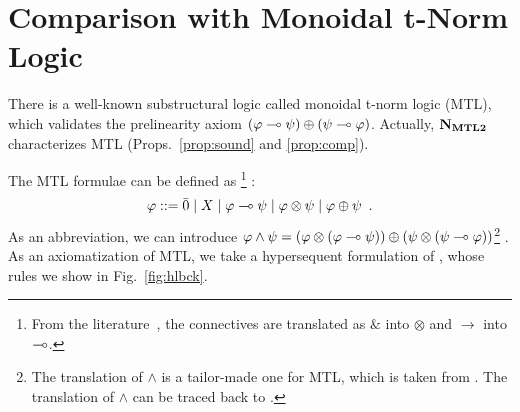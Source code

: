 \documentclass[envcountsame]{llncs}
\begin{document}
\section{Comparison with Monoidal t-Norm Logic}
\label{sec:as-logic}

There is a well-known substructural logic called monoidal t-norm logic
(MTL), which validates the prelinearity axiom
$(\varphi\multimap\psi)\oplus(\psi\multimap\varphi)$.  Actually, $\mathbf{N}_{\mathbf{MTL2}}$ characterizes
MTL (Props.~\ref{prop:sound} and \ref{prop:comp}).

The MTL formulae can be defined as%
\footnote{From the literature~\citep{handbook:fuzzy}, the connectives
are translated as $\&$ into $\otimes$ and $\rightarrow$ into $\multimap$.}%
:
\[
 \varphi::= \bar{0}\mid X\mid \varphi\multimap\psi \mid \varphi\otimes \psi \mid \varphi \oplus \psi\enspace.
\]
As an abbreviation, we can introduce $\varphi\land\psi =  (\varphi\otimes(\varphi\multimap\psi))\oplus
 (\psi\otimes(\psi\multimap\varphi))$\footnote{
The translation of $\wedge$ is a tailor-made one for MTL,
 which is taken from \citep[p.~48]{handbook:fuzzy}.  The translation of $\wedge$
can be traced back to \citet[Lem.~6.5]{Cintula200740}.}%
.
As an axiomatization of MTL, we take a hypersequent formulation of
\citet{baaz2004analytic}, whose rules we show in Fig.~\ref{fig:hlbck}.
\end{document}
